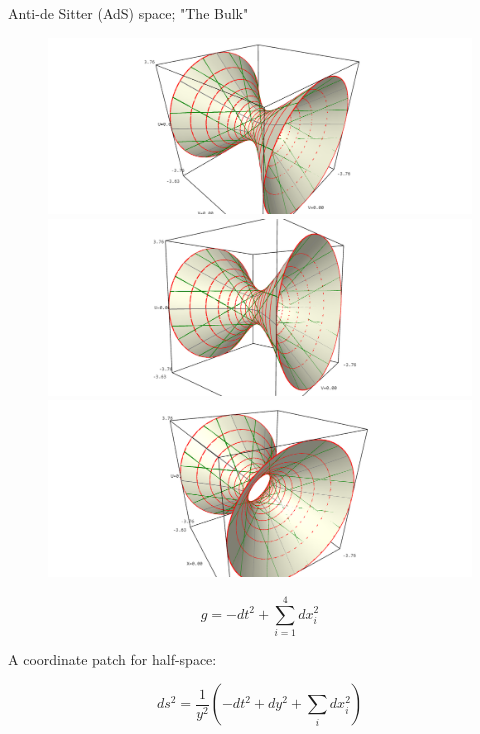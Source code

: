 \documentclass{beamer}
\begin{document}
\begin{frame}{Anti-de Sitter (AdS) space; "The Bulk"}

		\begin{figure}[!htb]
				\includegraphics[width=1.5\linewidth]{images/AdSscreenshot1.png} 
			\endminipage\hfill
				\includegraphics[width=1.5\linewidth]{images/AdSscreenshot2.png}
			\endminipage\hfill
				\includegraphics[width=1.5\linewidth]{images/AdSscreenshot3.png}
			\endminipage\hfill
		\end{figure}
\begin{equation*}
g = - dt^2 + \sum_{i=1}^4 dx_i^2
\end{equation*}

A coordinate patch for half-space:

\begin{equation*}
ds^2 = \frac{1}{y^2} \left( -dt^2 + dy^2 + \sum_i dx_i^2 \right)
\end{equation*}

\end{frame}
\end{document}
